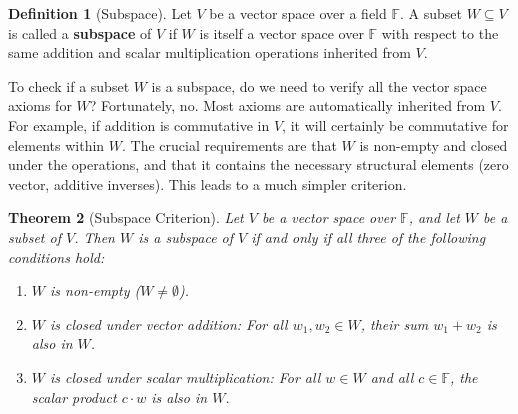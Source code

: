 \documentclass[11pt]{article}
\newtheorem{theorem}{Theorem}[section]
\theoremstyle{definition}
\newtheorem{definition}[theorem]{Definition}
\newcommand{\F}{\mathbb{F}}
\begin{document}
\begin{definition}[Subspace]
Let $V$ be a vector space over a field $\F$. A subset $W \subseteq V$ is called a \textbf{subspace} of $V$ if $W$ is itself a vector space over $\F$ with respect to the same addition and scalar multiplication operations inherited from $V$.
\end{definition}

To check if a subset $W$ is a subspace, do we need to verify all the vector space axioms for $W$? Fortunately, no. Most axioms are automatically inherited from $V$. For example, if addition is commutative in $V$, it will certainly be commutative for elements within $W$. The crucial requirements are that $W$ is non-empty and closed under the operations, and that it contains the necessary structural elements (zero vector, additive inverses). This leads to a much simpler criterion.

\begin{theorem}[Subspace Criterion]
Let $V$ be a vector space over $\F$, and let $W$ be a subset of $V$. Then $W$ is a subspace of $V$ if and only if all three of the following conditions hold:
\begin{enumerate}
    \item $W$ is non-empty ($W \neq \emptyset$).
    \item $W$ is closed under vector addition: For all $w_1, w_2 \in W$, their sum $w_1 + w_2$ is also in $W$.
    \item $W$ is closed under scalar multiplication: For all $w \in W$ and all $c \in \F$, the scalar product $c \cdot w$ is also in $W$.
\end{enumerate}
\end{theorem}
\end{document}
